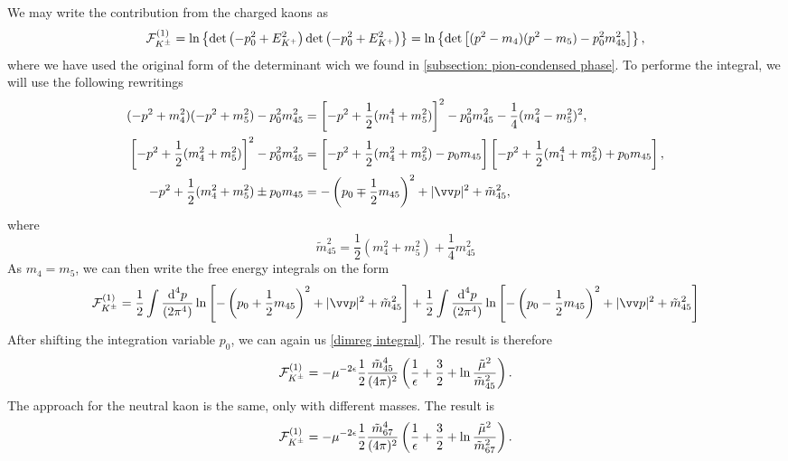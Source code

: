 We may write the contribution from the charged kaons as
%
\begin{equation}
    \mathcal{F}^{(1)}_{{K^\pm}}
    =
    \ln\left\{ 
        \det\left(- p_0^2 + E_{K^+}^2 \right) \det\left(- p_0^2 + E_{K^+}^2 \right) 
    \right\}
    =
    \ln\left\{ 
        \det\left[(p^2 - m_4)(p^2 - m_5) - p_0^2m_{45}^2\right]
    \right\},
\end{equation}
%
where we have used the original form of the determinant wich we found in \autoref{subsection: pion-condensed phase}.
To performe the integral, we will use the following rewritings
%
\begin{align}
    (-p^2 + m_4^2)(-p^2 + m_5^2) - p_0^2 m_{45}^2
    &
    = \left[-p^2 + \frac{1}{2}(m_1^4 + m_5^2)\right]^2 
    - p_0^2 m_{45}^2 - \frac{1}{4}(m_4^2 - m_5^2)^2, \\
    \left[-p^2 + \frac{1}{2}(m_4^2 + m_5^2)\right]^2 - p_0^2 m_{45}^2
    &
    = \left[-p^2 + \frac{1}{2}(m_4^2 + m_5^2) - p_0 m_{45} \right]
    \left[-p^2 + \frac{1}{2}(m_1^4 + m_5^2) + p_0 m_{45} \right], \\
    - p^2 + \frac{1}{2}(m_4^2 + m_5^2) \pm p_0 m_{45}
    &= - \left(p_0 \mp \frac{1}{2}m_{45}\right)^2 + |\vv p|^2 
    + 
    \tilde m_{45}^2, 
\end{align}
%
where
%
\begin{equation}
    \tilde m_{45}^2 = \frac{1}{2}(m_4^2 + m_5^2) + \frac{1}{4} m_{45}^2
\end{equation}
%
As $m_4 = m_5$, we can then write the free energy integrals on the form
%
\begin{equation}
    \Eff_\Kpm^{(1)}
    =
    \frac{1}{2} \int \frac{\dd^4 p}{(2\pi^4)}
    \ln \left[
        - \left(p_0 + \frac{1}{2}m_{45}\right)^2 
        + |\vv p|^2 
        + \tilde m_{45}^2 
    \right]
    +
    \frac{1}{2}
    \int \frac{\dd^4 p}{(2\pi^4)}
    \ln \left[
        - \left(p_0 - \frac{1}{2}m_{45}\right)^2 
        + |\vv p|^2 
        + \tilde m_{45}^2 
    \right]
\end{equation}
%
After shifting the integration variable $p_0$, we can again us \autoref{dimreg integral}.
The result is therefore
%
\begin{equation}
    \mathcal{F}_{K^\pm}^{(1)}
    =
    - \mu^{-2 \epsilon} \frac{1}{2} \frac{\tilde m_{45}^4}{(4\pi)^2} 
    \left(
        \frac{1}{\epsilon} + \frac{3}{2} + \ln \frac{\tilde \mu^2}{\tilde m_{45}^2}
    \right).
\end{equation}
%
The approach for the neutral kaon is the same, only with different masses.
The result is
%
\begin{equation}
    \mathcal{F}_{K^\pm}^{(1)}
    =
    - \mu^{-2 \epsilon} \frac{1}{2} \frac{\tilde m_{67}^4}{(4\pi)^2} 
    \left(
        \frac{1}{\epsilon} + \frac{3}{2} + \ln \frac{\tilde \mu^2}{\tilde m_{67}^2}
    \right).
\end{equation}
